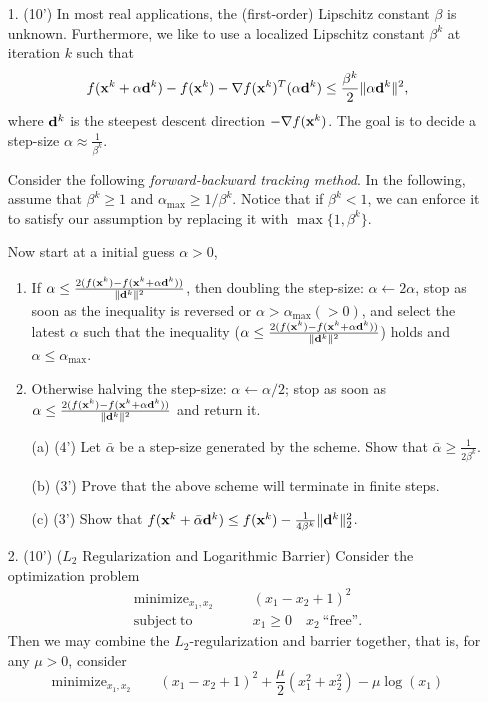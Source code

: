 \documentclass[12pt,letterpaper]{article}
\newcommand\x{{\bf x}}
\renewcommand\d{{\bf d}}
\begin{document}
\begin{enumerate}

\item[1.] (10') In most real applications, the (first-order) Lipschitz constant $\beta$ is unknown. Furthermore, we like to use a localized Lipschitz constant $\beta^k$ at iteration $k$ such that
\[
	f(\x^k + \alpha \d^k) - f(\x^k) - \nabla f(\x^k)^T(\alpha \d^k) \leq \frac{\beta^k}{2} \|\alpha \d^k\|^2,
\]
where $\d^k$ is the steepest descent direction $-\nabla f(\x^k)$. The goal is to decide a step-size $\alpha \approx \frac{1}{\beta^k}$.

Consider the following \emph{forward-backward tracking method}. In the following, assume that $\beta^k\geq 1$ and $\alpha_{\max}\geq 1/\beta^k$. Notice that if $\beta^k<1$, we can enforce it to satisfy our assumption by replacing it with $\max\{1,\beta^k\}$. 

Now start at a initial guess $\alpha > 0$,
\begin{enumerate}
	\item If $\alpha \leq \frac{2 (f(\x^k) - f(\x^k + \alpha \d^k))}{\|\d^k\|^2}$, then doubling the step-size: $\alpha \gets 2\alpha$, stop as soon as the inequality is reversed or $\alpha>\alpha_{\max}(>0)$, and select the latest $\alpha$ such that the inequality ($\alpha \leq \frac{2 (f(\x^k) - f(\x^k + \alpha \d^k))}{\|\d^k\|^2}$) holds and $\alpha\leq \alpha_{\max}$.
	\item Otherwise halving the step-size: $\alpha \gets \alpha/2$; stop as soon as $\alpha \leq \frac{2 (f(\x^k) - f(\x^k + \alpha \d^k))}{\|\d^k\|^2}$ and return it.
\end{enumerate}

\begin{enumerate}
	\item [(a)] (4') Let $\bar{\alpha}$ be a step-size generated by the scheme. Show that $\bar{\alpha} \geq \frac{1}{2\beta^k}$.
	\item [(b)] (3') Prove that the above scheme will terminate in finite steps.
	\item [(c)] (3') Show that $f(\x^k + \bar{\alpha} \d^k) \leq f(\x^k) - \frac{1}{4\beta^k} \|\d^k\|_2^2$.
\end{enumerate}


\item[2.] (10') ($L_2$ Regularization and Logarithmic Barrier) Consider the optimization problem
\begin{align*}
\mathrm{minimize}_{x_1, x_2}   \qquad &  (x_1-x_2+1)^2\\
\mathrm{subject~to} \qquad & x_1\ge 0 \quad x_2\ \text{``free''} .
\end{align*}
Then we may combine the $L_2$-regularization and barrier together, that is, for any $\mu>0$, consider
\[
    \mathrm{minimize}_{x_1, x_2} \qquad  (x_1-x_2+1)^2+\frac{\mu}{2}(x_1^2+x_2^2)-\mu\log(x_1)  
\]


\end{enumerate}
\end{document}
